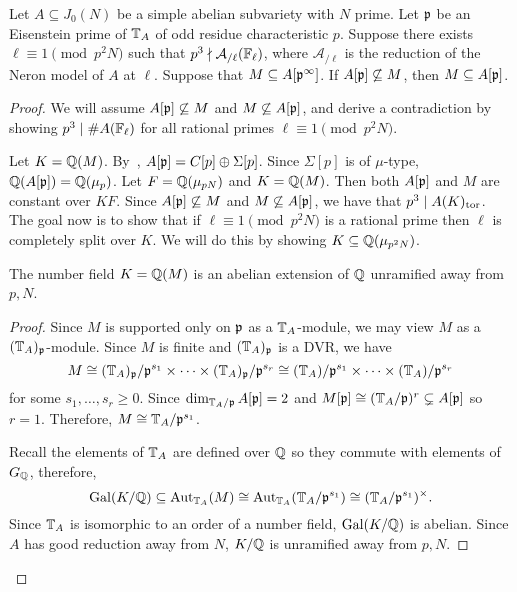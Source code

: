 \documentclass[thesis.tex]{subfiles}
\begin{document}
\begin{proposition}{{\cite[Prop. 4.5]{klosin-papikian:ribet}}}%
    \label{prop:eisenstein_cyclic}
    Let $A\subseteq J_0(N)$ be a simple abelian subvariety with $N$ prime. Let
    $\mathfrak{p}$ be an Eisenstein prime of $\mathbb{T}_A$ of odd residue characteristic $p$.
    Suppose there exists $\ell\equiv 1\pmod{p^2N}$ such that $p^3\nmid
    \mathcal{A}_{/\ell}(\mathbb{F}_\ell)$, where $\mathcal{A}_{/\ell}$ is the
    reduction of the Neron model of $A$ at $\ell$. Suppose that $M\subseteq
    A[\mathfrak{p}^\infty]$. If $A[\mathfrak{p}]\not\subseteq M$, then $M\subseteq A[\mathfrak{p}]$.
\end{proposition}
\begin{proof}
    We will assume $A[\mathfrak{p}]\not\subseteq M$ and $M\not\subseteq A[\mathfrak{p}]$, and
    derive a contradiction by showing $p^3\mid \#A(\mathbb{F}_\ell)$ for all rational
    primes $\ell \equiv 1\pmod{p^2N}$.

    Let $K=\mathbb{Q}(M)$. By~\cite[Cor. 16.3]{mazur:eisenstein}, $A[\mathfrak{p}]=C[p]\oplus
    \Sigma[p]$. Since $\Sigma[p]$ is of $\mu$-type, $\mathbb{Q}(A[\mathfrak{p}])=\mathbb{Q}(\mu_p)$.
    Let $F=\mathbb{Q}(\mu_{pN})$ and $K=\mathbb{Q}(M)$. Then both $A[\mathfrak{p}]$ and $M$ are
    constant over $KF$. Since $A[\mathfrak{p}]\not\subseteq M$ and $M\not\subseteq
    A[\mathfrak{p}]$, we have that $p^3\mid A(K)_{\mathrm{tor}}$. The goal now is to show that if
    $\ell\equiv 1\pmod{p^2N}$ is a rational prime then $\ell$ is completely
    split over $K$. We will do this by showing $K \subseteq \mathbb{Q}(\mu_{p^2 N})$.

    \begin{lemma}
        The number field $K=\mathbb{Q}(M)$ is an abelian extension of $\mathbb{Q}$ unramified
        away from $p, N$.
    \end{lemma}
    \begin{proof}
        Since $M$ is supported only on $\mathfrak{p}$ as a $\mathbb{T}_A$-module, we may view
        $M$ as a $(\mathbb{T}_A)_{\mathfrak{p}}$-module. Since $M$ is finite and $(\mathbb{T}_A)_{\mathfrak{p}}$ is a
        DVR\@, we have
        \[
            M\cong (\mathbb{T}_A)_{\mathfrak{p}} / \mathfrak{p}^{s_1} \times\cdots \times (\mathbb{T}_A)_{\mathfrak{p}} /
            \mathfrak{p}^{s_r}\cong (\mathbb{T}_A)/\mathfrak{p}^{s_1} \times \cdots \times
            (\mathbb{T}_A)/\mathfrak{p}^{s_r}
        \]
        for some $s_1,\ldots,s_r\geq 0$. Since $\dim_{\mathbb{T}_A/\mathfrak{p}} A[\mathfrak{p}]=2$ and
        $M[\mathfrak{p}]\cong (\mathbb{T}_A / \mathfrak{p})^r \subsetneq A[\mathfrak{p}]$ so $r=1$. Therefore,
        $M\cong \mathbb{T}_A/\mathfrak{p}^{s_1}$.

        Recall the elements of $\mathbb{T}_A$ are defined over $\mathbb{Q}$ so they commute
        with elements of $G_{\mathbb{Q}}$, therefore,
        \[
            \operatorname{Gal}(K/\mathbb{Q})\subseteq \operatorname{Aut}_{\mathbb{T}_A} (M) \cong \operatorname{Aut}_{\mathbb{T}_A}
            (\mathbb{T}_A/\mathfrak{p}^{s_1}) \cong (\mathbb{T}_A/\mathfrak{p}^{s_1})^\times.
        \]
        Since $\mathbb{T}_A$ is isomorphic to an order of a number field,
        $\operatorname{Gal}(K/\mathbb{Q})$ is abelian. Since $A$ has good reduction away from $N$,
        $K/\mathbb{Q}$ is unramified away from $p, N$.
    \end{proof}


\end{proof}
\end{document}
